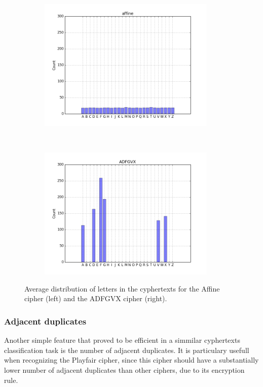 \documentclass[a4paper]{article}
\begin{document}
\begin{figure}[H]
    \centering
    \begin{subfigure}[h]{0.5\textwidth}
    		\centering
        \includegraphics[height=2.5in]{img/affine_dist.png}
    \end{subfigure}%
    ~
    \begin{subfigure}[h]{0.5\textwidth}
	    \centering
        \includegraphics[height=2.5in]{img/adfgvx_dist.png}
    \end{subfigure}
    \caption{Average distribution of letters in the cyphertexts for the Affine cipher (left) and the ADFGVX cipher (right).}
    \label{fig:letter_dist}
\end{figure}

\subsubsection*{Adjacent duplicates}
Another simple feature that proved to be efficient in a simmilar cyphertexts classification task \cite{sivagurunathan2010classification} is the number of adjacent duplicates. It is particulary usefull when recognizing the Playfair cipher, since this cipher should have a substantially lower number of adjacent duplicates than other ciphers, due to its encryption rule.
\end{document}
